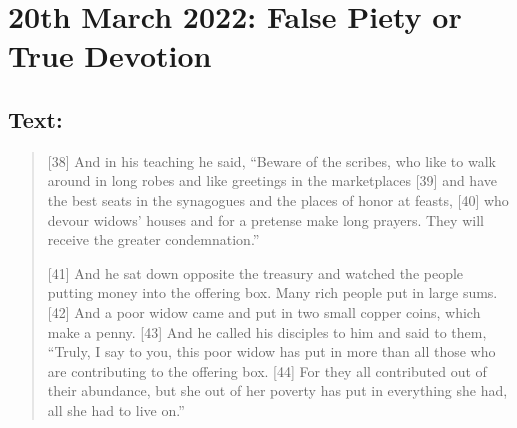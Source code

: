 \section{20th March 2022: False Piety or True Devotion}
\subsection*{Text: }
  \begin{quote}
    [38] And in his teaching he said, “Beware of the scribes, who like to
    walk around in long robes and like greetings in the marketplaces [39] and
    have the best seats in the synagogues and the places of honor at feasts,
    [40] who devour widows’ houses and for a pretense make long prayers.
    They will receive the greater condemnation.”

    [41] And he sat down opposite the treasury and watched the people putting
    money into the offering box.  Many rich people put in large sums.  [42]
    And a poor widow came and put in two small copper coins, which make a
    penny.  [43] And he called his disciples to him and said to them, “Truly,
    I say to you, this poor widow has put in more than all those who are
    contributing to the offering box.  [44] For they all contributed out of
    their abundance, but she out of her poverty has put in everything she
    had, all she had to live on.”
  \end{quote}
